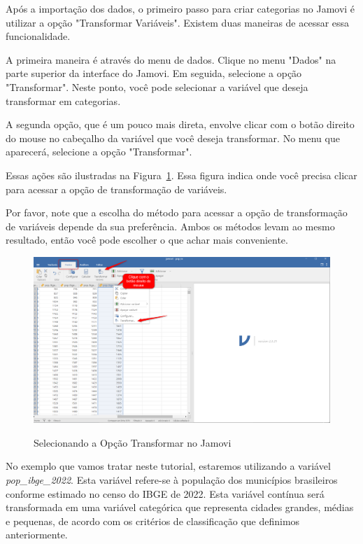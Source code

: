 Após a importação dos dados, o primeiro passo para criar categorias no Jamovi é utilizar a opção "Transformar Variáveis". Existem duas maneiras de acessar essa funcionalidade.

A primeira maneira é através do menu de dados. Clique no menu "Dados" na parte superior da interface do Jamovi. Em seguida, selecione a opção "Transformar". Neste ponto, você pode selecionar a variável que deseja transformar em categorias.

A segunda opção, que é um pouco mais direta, envolve clicar com o botão direito do mouse no cabeçalho da variável que você deseja transformar. No menu que aparecerá, selecione a opção "Transformar".

Essas ações são ilustradas na Figura~\ref{fig:criar_categoria_jamovi}. Essa figura indica onde você precisa clicar para acessar a opção de transformação de variáveis.

Por favor, note que a escolha do método para acessar a opção de transformação de variáveis depende da sua preferência. Ambos os métodos levam ao mesmo resultado, então você pode escolher o que achar mais conveniente.

\begin{figure}[H]
    \centering
    \caption{Selecionando a Opção Transformar no Jamovi}
    \includegraphics[width=\textwidth]{imagens/cap_2/criar_categoria_jamovi.png}
    \label{fig:criar_categoria_jamovi}
\end{figure}

No exemplo que vamos tratar neste tutorial, estaremos utilizando a variável \textit{pop\_ibge\_2022}. Esta variável refere-se à população dos municípios brasileiros conforme estimado no censo do IBGE de 2022. Esta variável contínua será transformada em uma variável categórica que representa cidades grandes, médias e pequenas, de acordo com os critérios de classificação que definimos anteriormente.


